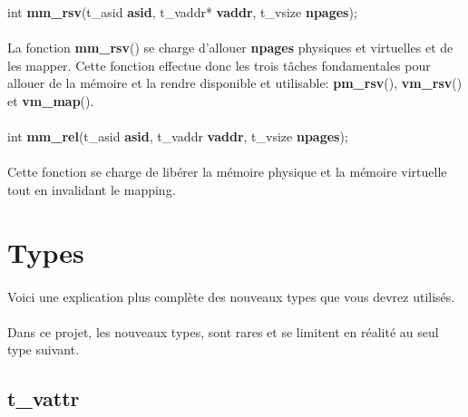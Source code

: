 \documentclass[10pt,a4wide]{article}
\begin{document}
\hspace{1.5cm}int \textbf{mm\_rsv}(t\_asid \textbf{asid},
                                   t\_vaddr* \textbf{vaddr},
                                   t\_vsize \textbf{npages});

\paragraph{}

La fonction \textbf{mm\_rsv}() se charge d'allouer \textbf{npages} physiques
et virtuelles et de les mapper. Cette fonction effectue donc les trois
t\^aches fondamentales pour allouer de la m\'emoire et la rendre disponible
et utilisable: \textbf{pm\_rsv}(), \textbf{vm\_rsv}() et \textbf{vm\_map}().

\paragraph{}

\hspace{1.5cm}int \textbf{mm\_rel}(t\_asid \textbf{asid},
                                   t\_vaddr \textbf{vaddr},
                                   t\_vsize \textbf{npages});

\paragraph{}

Cette fonction se charge de lib\'erer la m\'emoire physique et la m\'emoire
virtuelle tout en invalidant le mapping.

\section{Types}

\paragraph{}

Voici une explication plus compl\`ete des nouveaux types que
vous devrez utilis\'es.

\paragraph{}

Dans ce projet, les nouveaux types, sont rares et se limitent en r\'ealit\'e
au seul type suivant.

\subsection{t\_vattr}
\end{document}
